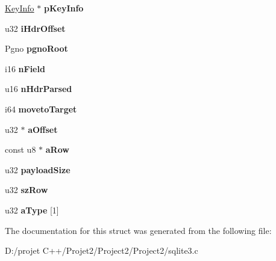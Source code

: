 \begin{DoxyCompactItemize}
\begin{tabbing}
\end{tabbing}\item 
\mbox{\label{struct_vdbe_cursor_a72a6c26ab2ab2ad699dfb45703ea4765}} 
\mbox{\hyperlink{struct_key_info}{Key\+Info}} $\ast$ {\bfseries p\+Key\+Info}
\item 
\mbox{\label{struct_vdbe_cursor_a838b93338c0a8539e28697e291c83a91}} 
u32 {\bfseries i\+Hdr\+Offset}
\item 
\mbox{\label{struct_vdbe_cursor_aaff39caaa6bada9b2cd27dbc1fd2a5fc}} 
Pgno {\bfseries pgno\+Root}
\item 
\mbox{\label{struct_vdbe_cursor_a2c903d08588ce7ade6ca4f678bd83bbb}} 
i16 {\bfseries n\+Field}
\item 
\mbox{\label{struct_vdbe_cursor_a3e0ed59c6fd714032e665a6249087924}} 
u16 {\bfseries n\+Hdr\+Parsed}
\item 
\mbox{\label{struct_vdbe_cursor_af3c157d480c0597ba50aca227eb8e3b8}} 
i64 {\bfseries moveto\+Target}
\item 
\mbox{\label{struct_vdbe_cursor_a17431e67b341282aeb6c026cd01ec1e9}} 
u32 $\ast$ {\bfseries a\+Offset}
\item 
\mbox{\label{struct_vdbe_cursor_a6b6f7444963e83e48cd3d63edf539c94}} 
const u8 $\ast$ {\bfseries a\+Row}
\item 
\mbox{\label{struct_vdbe_cursor_a92f39b19e82152386e20ede96d177058}} 
u32 {\bfseries payload\+Size}
\item 
\mbox{\label{struct_vdbe_cursor_ac0fa6de4df7f418dfd5307cb892ba455}} 
u32 {\bfseries sz\+Row}
\item 
\mbox{\label{struct_vdbe_cursor_aa4a4b02d8b0276a413f1191382469141}} 
u32 {\bfseries a\+Type} \mbox{[}1\mbox{]}
\end{DoxyCompactItemize}


The documentation for this struct was generated from the following file\+:\begin{DoxyCompactItemize}
\item 
D\+:/projet C++/\+Projet2/\+Project2/\+Project2/sqlite3.\+c\end{DoxyCompactItemize}
